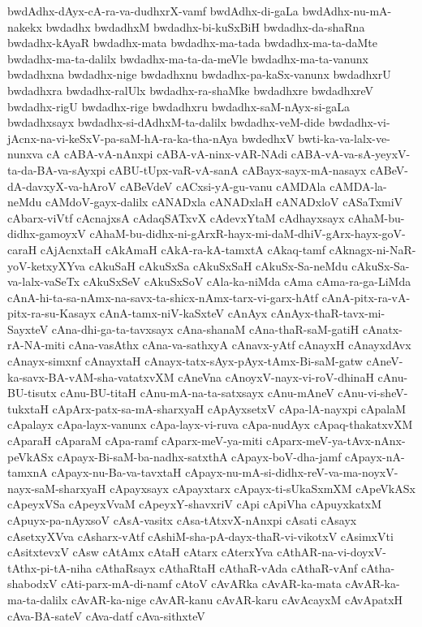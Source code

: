 {bwdAdhx-dAyx-cA-ra-va-dudhxrX-vamf
bwdAdhx-di-gaLa
bwdAdhx-nu-mA-nakekx
bwdadhx
bwdadhxM
bwdadhx-bi-kuSxBiH
bwdadhx-da-shaRna
bwdadhx-kAyaR
bwdadhx-mata
bwdadhx-ma-tada
bwdadhx-ma-ta-daMte
bwdadhx-ma-ta-dalilx
bwdadhx-ma-ta-da-meVle
bwdadhx-ma-ta-vanunx
bwdadhxna
bwdadhx-nige
bwdadhxnu
bwdadhx-pa-kaSx-vanunx
bwdadhxrU
bwdadhxra
bwdadhx-ralUlx
bwdadhx-ra-shaMke
bwdadhxre
bwdadhxreV
bwdadhx-rigU
bwdadhx-rige
bwdadhxru
bwdadhx-saM-nAyx-si-gaLa
bwdadhxsayx
bwdadhx-si-dAdhxM-ta-dalilx
bwdadhx-veM-dide
bwdadhx-vi-jAcnx-na-vi-keSxV-pa-saM-hA-ra-ka-tha-nAya
bwdedhxV
bwti-ka-va-lalx-ve-nunxva
cA
cABA-vA-nAnxpi
cABA-vA-ninx-vAR-NAdi
cABA-vA-va-sA-yeyxV-ta-da-BA-va-sAyxpi
cABU-tUpx-vaR-vA-sanA
cABayx-sayx-mA-nasayx
cABeV-dA-davxyX-va-hAroV
cABeVdeV
cACxsi-yA-gu-vanu
cAMDAla
cAMDA-la-neMdu
cAMdoV-gayx-dalilx
cANADxla
cANADxlaH
cANADxloV
cASaTxmiV
cAbarx-viVtf
cAcnajxsA
cAdaqSATxvX
cAdevxYtaM
cAdhayxsayx
cAhaM-bu-didhx-gamoyxV
cAhaM-bu-didhx-ni-gArxR-hayx-mi-daM-dhiV-gArx-hayx-goV-caraH
cAjAcnxtaH
cAkAmaH
cAkA-ra-kA-tamxtA
cAkaq-tamf
cAknagx-ni-NaR-yoV-ketxyXYva
cAkuSaH
cAkuSxSa
cAkuSxSaH
cAkuSx-Sa-neMdu
cAkuSx-Sa-va-lalx-vaSeTx
cAkuSxSeV
cAkuSxSoV
cAla-ka-niMda
cAma
cAma-ra-ga-LiMda
cAnA-hi-ta-sa-nAmx-na-savx-ta-shicx-nAmx-tarx-vi-garx-hAtf
cAnA-pitx-ra-vA-pitx-ra-su-Kasayx
cAnA-tamx-niV-kaSxteV
cAnAyx
cAnAyx-thaR-tavx-mi-SayxteV
cAna-dhi-ga-ta-tavxsayx
cAna-shanaM
cAna-thaR-saM-gatiH
cAnatx-rA-NA-miti
cAna-vasAthx
cAna-va-sathxyA
cAnavx-yAtf
cAnayxH
cAnayxdAvx
cAnayx-simxnf
cAnayxtaH
cAnayx-tatx-sAyx-pAyx-tAmx-Bi-saM-gatw
cAneV-ka-savx-BA-vAM-sha-vatatxvXM
cAneVna
cAnoyxV-nayx-vi-roV-dhinaH
cAnu-BU-tisutx
cAnu-BU-titaH
cAnu-mA-na-ta-satxsayx
cAnu-mAneV
cAnu-vi-sheV-tukxtaH
cApArx-patx-sa-mA-sharxyaH
cApAyxsetxV
cApa-lA-nayxpi
cApalaM
cApalayx
cApa-layx-vanunx
cApa-layx-vi-ruva
cApa-nudAyx
cApaq-thakatxvXM
cAparaH
cAparaM
cApa-ramf
cAparx-meV-ya-miti
cAparx-meV-ya-tAvx-nAnx-peVkASx
cApayx-Bi-saM-ba-nadhx-satxthA
cApayx-boV-dha-jamf
cApayx-nA-tamxnA
cApayx-nu-Ba-va-tavxtaH
cApayx-nu-mA-si-didhx-reV-va-ma-noyxV-nayx-saM-sharxyaH
cApayxsayx
cApayxtarx
cApayx-ti-sUkaSxmXM
cApeVkASx
cApeyxVSa
cApeyxVvaM
cApeyxY-shavxriV
cApi
cApiVha
cApuyxkatxM
cApuyx-pa-nAyxsoV
cAsA-vasitx
cAsa-tAtxvX-nAnxpi
cAsati
cAsayx
cAsetxyXVva
cAsharx-vAtf
cAshiM-sha-pA-dayx-thaR-vi-vikotxV
cAsimxVti
cAsitxtevxV
cAsw
cAtAmx
cAtaH
cAtarx
cAterxYva
cAthAR-na-vi-doyxV-tAthx-pi-tA-niha
cAthaRsayx
cAthaRtaH
cAthaR-vAda
cAthaR-vAnf
cAtha-shabodxV
cAti-parx-mA-di-namf
cAtoV
cAvARka
cAvAR-ka-mata
cAvAR-ka-ma-ta-dalilx
cAvAR-ka-nige
cAvAR-kanu
cAvAR-karu
cAvAcayxM
cAvApatxH
cAva-BA-sateV
cAva-datf
cAva-sithxteV
}
